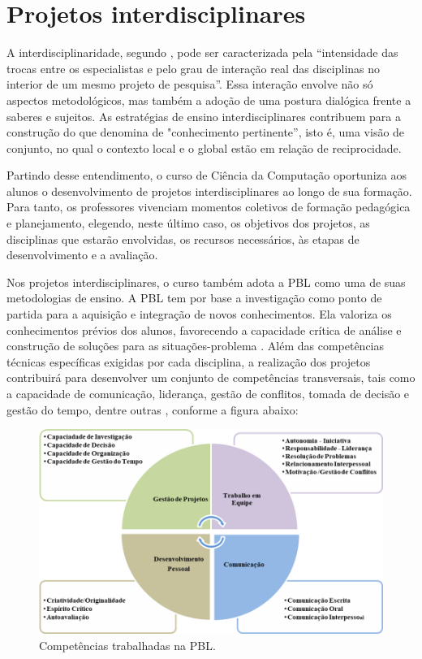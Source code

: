 \documentclass[
	12pt,				%
	openright,			%
  oneside,     %
	a4paper,			%
	chapter=TITLE,		%
	english,			%
	french,				%
	spanish,			%
	brazil				%
	]{abntex2}
\begin{document}
\section{Projetos interdisciplinares}

A interdisciplinaridade, segundo , pode ser caracterizada pela “intensidade das trocas entre os especialistas e pelo grau de interação real das disciplinas no interior de um mesmo projeto de pesquisa”. Essa interação envolve não só aspectos metodológicos, mas também a adoção de uma postura dialógica frente a saberes e sujeitos. As estratégias de ensino interdisciplinares contribuem para a construção do que  denomina de "conhecimento pertinente”, isto é, uma visão de conjunto, no qual o contexto local e o global estão em relação de reciprocidade.
	
Partindo desse entendimento, o curso de Ciência da Computação oportuniza aos alunos o desenvolvimento de projetos interdisciplinares ao longo de sua formação. Para tanto, os professores vivenciam momentos coletivos de formação pedagógica e planejamento, elegendo, neste último caso, os objetivos dos projetos, as disciplinas que estarão envolvidas, os recursos necessários, às etapas de desenvolvimento e a avaliação.

Nos projetos interdisciplinares, o curso também adota a PBL como uma de suas metodologias de ensino. A PBL tem por base a investigação como ponto de partida para a aquisição e integração de novos conhecimentos. Ela valoriza os conhecimentos prévios dos alunos, favorecendo a capacidade crítica de análise e construção de soluções para as situações-problema \cite{barrows1986taxonomy}. Além das competências técnicas específicas exigidas por cada disciplina, a realização dos projetos contribuirá para desenvolver um conjunto de competências transversais, tais como a capacidade de comunicação, liderança, gestão de conflitos, tomada de decisão e gestão do tempo, dentre outras \cite{cabral2006competencias}, conforme a figura abaixo:

\begin{figure}[!htb]
    \centering
    \caption{\label{fig:competencias-pbl}Competências trabalhadas na PBL.}
    
    \includegraphics[width=\textwidth]{images/competencias_pbl.png}
  \end{figure}
\end{document}
